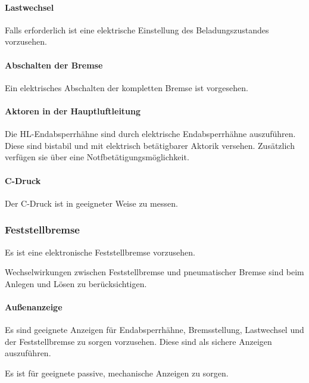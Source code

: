 \paragraph{Lastwechsel}
\begin{feat}
Falls erforderlich ist eine elektrische Einstellung des Beladungszustandes vorzusehen.
\end{feat}

\paragraph{Abschalten der Bremse}
\begin{feat}
Ein elektrisches Abschalten der kompletten Bremse ist vorgesehen.
\end{feat}

\paragraph{Aktoren in der Hauptluftleitung}
\begin{feat}
Die \acrshort{HL}-Endabsperrhähne sind durch elektrische Endabsperrhähne auszuführen. Diese sind bistabil und mit elektrisch betätigbarer Aktorik versehen. Zusätzlich verfügen sie über eine Notfbetätigungsmöglichkeit.
\end{feat}

\paragraph{C-Druck}
\begin{feat}
Der C-Druck ist in geeigneter Weise zu messen.
\end{feat}

\subsubsection{Feststellbremse}
\begin{feat}
Es ist eine elektronische Feststellbremse vorzusehen.
\end{feat}
\begin{rem}[zu Anf. 25]
Wechselwirkungen zwischen Feststellbremse und pneumatischer Bremse sind beim Anlegen und Lösen zu berücksichtigen.
\end{rem}

\paragraph{Außenanzeige}
\begin{feat}
Es sind geeignete Anzeigen für Endabsperrhähne, Bremsstellung, \gls{Lastwechsel} und der Feststellbremse zu sorgen vorzusehen. Diese sind als sichere Anzeigen auszuführen.
\end{feat}
\begin{feat}
Es ist für geeignete passive, mechanische Anzeigen zu sorgen.
\end{feat}

